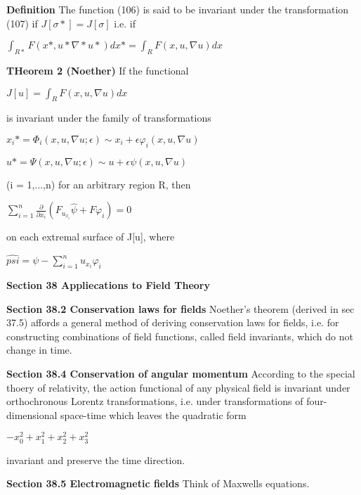 \documentclass{article}
\begin{document}
\textbf {Definition} The function (106) is said to be invariant under the transformation (107) if $J[\sigma*] = J[\sigma]$ i.e. if
\begin{center}
$\int_{R*} F(x*, u* \nabla* u*) dx* = \int_R F(x,u, \nabla u) dx$
\end{center}

\textbf {THeorem 2 (Noether)} If the functional
\begin{center}
$J[u] = \int_R F(x,u, \nabla u) dx$
\end{center}
is invariant under the family of transformations
\begin{center}
$x_i* = \Phi_i(x, u, \nabla u; \epsilon) \sim x_i + \epsilon \varphi_i (x, u, \nabla u)$
\end{center}
\begin{center}
$u* = \Psi(x,u, \nabla u; \epsilon) \sim u + \epsilon \psi(x, u, \nabla u)$
\end{center}
(i = 1,...,n) for an arbitrary region R, then
\begin{center}
$\sum_{i=1}^n \frac{\partial}{\partial x_i} (F_{u_{x_{i}}} \hat{\psi} + F \varphi_i) = 0$
\end{center}
on each extremal surface of J[u], where
\begin{center}
$\hat{psi} = \psi - \sum_{i=1}^n u_{x_i} \varphi_i$
\end{center}

\textbf {Section 38 Appliecations to Field Theory}

\textbf {Section 38.2 Conservation laws for fields} Noether's theorem (derived in sec 37.5) affords a general method of deriving conservation laws for fields, i.e. for constructing combinations of field functions, called field invariants, which do not change in time.

\textbf {Section 38.4 Conservation of angular momentum} According to the special thoery of relativity, the action functional of any physical field is invariant under orthochronous Lorentz transformations, i.e. under transformations of four-dimensional space-time which leaves the quadratic form
\begin{center}
$-x_0^2 + x_1^2 + x_2^2 + x_3^2$
\end{center}
invariant and preserve the time direction.

\textbf {Section 38.5 Electromagnetic fields} Think of Maxwells equations.
\end{document}

